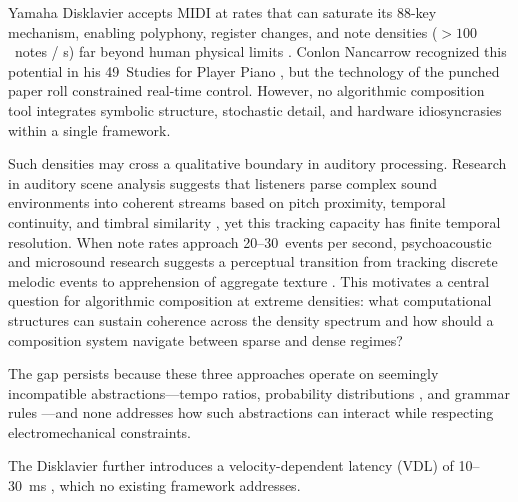 \documentclass[a4paper]{article}
\theoremstyle{definition}
\theoremstyle{remark}
\begin{document}
Yamaha Disklavier accepts MIDI at rates that can saturate its 88-key mechanism, enabling polyphony, register changes, and note densities (${>}100$~notes / s) far beyond human physical limits \citep{goebl2003measurement}. Conlon Nancarrow recognized this potential in his 49~Studies for Player Piano \citep{gann1995music}, but the technology of the punched paper roll constrained real-time control. However, no algorithmic composition tool integrates symbolic structure, stochastic detail, and hardware idiosyncrasies within a single framework.

Such densities may cross a qualitative boundary in auditory processing. Research in auditory scene analysis suggests that listeners parse complex sound environments into coherent streams based on pitch proximity, temporal continuity, and timbral similarity \citep{bregman1994auditory}, yet this tracking capacity has finite temporal resolution. When note rates approach 20--30~events per second, psychoacoustic and microsound research suggests a perceptual transition from tracking discrete melodic events to apprehension of aggregate texture \citep{roads2004microsound, Noorden1975TemporalCI}. This motivates a central question for algorithmic composition at extreme densities: what computational structures can sustain coherence across the density spectrum and how should a composition system navigate between sparse and dense regimes?

The gap persists because these three approaches operate on seemingly incompatible abstractions---tempo ratios, probability distributions \citep{xenakis1992formalized}, and grammar rules \citep{prusinkiewicz2012algorithmic, manousakis2006musical}---and none addresses how such abstractions can interact while respecting electromechanical constraints.

The Disklavier further introduces a velocity-dependent latency (VDL) of 10--30~ms \citep{goebl2003measurement}, which no existing framework addresses.
\end{document}
